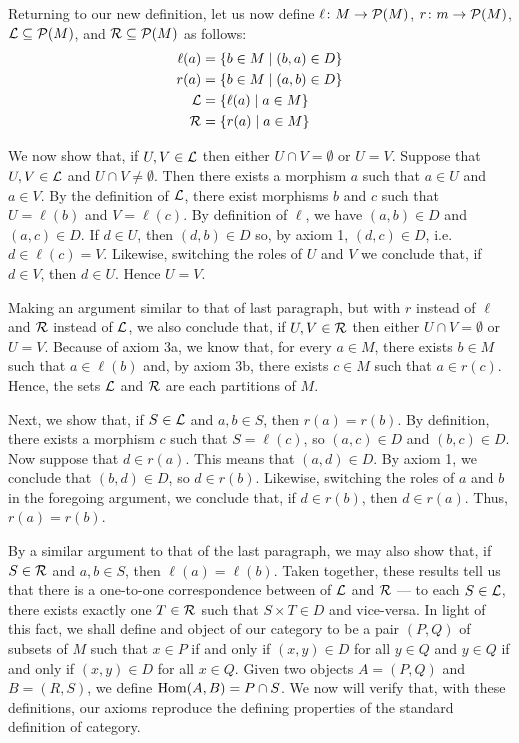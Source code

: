 \documentclass[12pt]{article}
\begin{document}
Returning to our new definition, let us now define $\ell \colon M \to {\cal P} (M)$, 
$r \colon m \to {\cal P} (M)$, ${\cal L} \subseteq {\cal P} (M)$, and
${\cal R} \subseteq {\cal P} (M)$ as follows:
\begin{align*}
 \ell (a) &= \{ b \in M \mid (b,a) \in D \} \\ 
 r (a) &= \{ b \in M \mid (a,b) \in D \} \\ 
 {\cal L} &= \{ \ell (a) \mid a \in M \} \\
 {\cal R} &= \{ r (a) \mid a \in M \}
\end{align*}

We now show that, if $U,V \in {\cal L}$ then either $U \cap V = \emptyset$
or $U = V$.  Suppose that $U,V \in {\cal L}$ and $U \cap V \neq \emptyset$.
Then there exists a morphism $a$ such that $a \in U$ and $a \in V$.  By the
definition of ${\cal L}$, there exist morphisms $b$ and $c$ such that 
$U = \ell (b)$ and $V = \ell (c)$.  By definition of $\ell$, we have $(a,b)
\in D$ and $(a,c) \in D$.  If $d \in U$, then $(d,b) \in D$ so, by axiom 1,
$(d,c) \in D$, i.e. $d \in \ell (c) = V$.  Likewise, switching the roles of
$U$ and $V$ we conclude that, if $d \in V$, then $d \in U$.  Hence $U = V$.

Making an argument similar to that of last paragraph, but with $r$ instead
of $\ell$ and ${\cal R}$ instead of ${\cal L}$, we also conclude that, if 
$U,V \in {\cal R}$ then either 
$U \cap V = \emptyset$ or $U = V$.  Because of axiom 3a, we know that, for
every $a \in M$, there exists $b \in M$ such that $a \in \ell (b)$ and, by 
axiom 3b, there exists $c \in M$ such that $a \in r (c)$.  Hence, the sets
${\cal L}$ and ${\cal R}$ are each partitions of $M$.

Next, we show that, if $S \in {\cal L}$ and $a,b \in S$, then $r(a) = r(b)$.
By definition, there exists a morphism $c$ such that $S = \ell (c)$, so
$(a,c) \in D$ and $(b,c) \in D$.  Now suppose that $d \in r(a)$.  This means
that $(a,d) \in D$.  By axiom 1, we conclude that $(b,d) \in D$, so $d \in
r(b)$.  Likewise, switching the roles of $a$ and $b$ in the foregoing argument,
we conclude that, if $d \in r(b)$, then $d \in r(a)$.  Thus, $r(a) = r(b)$. 

By a similar argument to that of the last paragraph, we may also show that,
if $S \in {\cal R}$ and $a,b \in S$, then $\ell(a) = \ell(b)$.  Taken together,
these results tell us that there is a one-to-one correspondence between 
of ${\cal L}$ and ${\cal R}$ --- to each $S \in {\cal L}$, there exists exactly
one $T \in {\cal R}$ such that $S \times T \in D$ and vice-versa.  In light
of this fact, we shall define and object of our category to be a pair $(P,Q)$
of subsets of $M$ such that $x \in P$ if and only if $(x,y) \in D$ for all
$y \in Q$ and $y \in Q$ if and only if $(x,y) \in D$ for all $x \in Q$.  Given
two objects $A = (P,Q)$ and $B = (R,S)$, we define ${\rm Hom} (A,B) = P \cap S$.
We now will verify that, with these definitions, our axioms reproduce the
defining properties of the standard definition of category.
\end{document}
